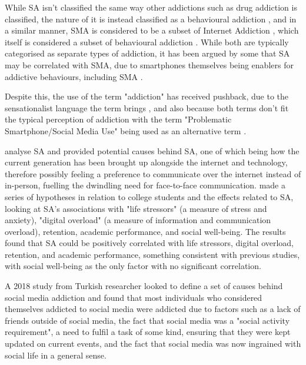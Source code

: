 \documentclass[12pt]{article}
\begin{document}
While SA isn't classified the same way other addictions such as drug addiction is classified, the nature of it is 
instead classified as a behavioural addiction \autocite{RefWorks:RefID:68-king2017impact}, and in a similar manner, 
SMA is considered to be a subset of Internet Addiction \autocite{RefWorks:RefID:66-hou2019social}, which itself is 
considered a subset of behavioural addiction \autocite{RefWorks:RefID:95-chou2005review}. While both are 
typically categorised as separate types of addiction, it has been argued by some that SA may be correlated with 
SMA, due to smartphones themselves being enablers for addictive behaviours, including SMA 
\autocite{RefWorks:RefID:73-kuss2017social}. \newline

Despite this, the use of the term "addiction" has received pushback, due to the sensationalist language the term brings \autocite{RefWorks:RefID:96-adorjan2021smartphone}, and also 
because both terms don't fit the typical perception of addiction with the term "Problematic Smartphone/Social Media Use" being used as an alternative 
term \autocite{RefWorks:RefID:97-rozgonjuk2018problematic}.\newline

\textcite{RefWorks:RefID:78-bhalerao2020analysis} analyse SA and provided potential causes 
behind SA, one of which being how the current generation has been brought up alongside the internet 
and technology, therefore possibly feeling a preference to communicate over the internet instead of 
in-person, fuelling the dwindling need for face-to-face communication. \textcite{RefWorks:RefID:68-king2017impact} 
made a series of hypotheses in relation to college students and the effects 
related to SA, looking at SA's associations with "life stressors" (a measure of stress and anxiety), "digital overload" 
(a measure of information and communication overload), retention, academic performance, and social well-being. The results 
found that SA could be positively correlated with life stressors, digital overload, retention, and academic performance, 
something consistent with previous studies, with social well-being as the only factor with no significant correlation.\newline

A 2018 study from Turkish researcher \textcite{RefWorks:RefID:100-aksoy2018qualitative} 
looked to define a set of causes behind social media addiction and found that most individuals who considered themselves addicted to social media
were addicted due to factors such as a lack of friends outside of social media, the fact that social media was a "social activity requirement", a need to fulfil a task of some kind, ensuring 
that they were kept updated on current events, and the fact that social media was now ingrained with social life in a general sense.\newline
\end{document}
